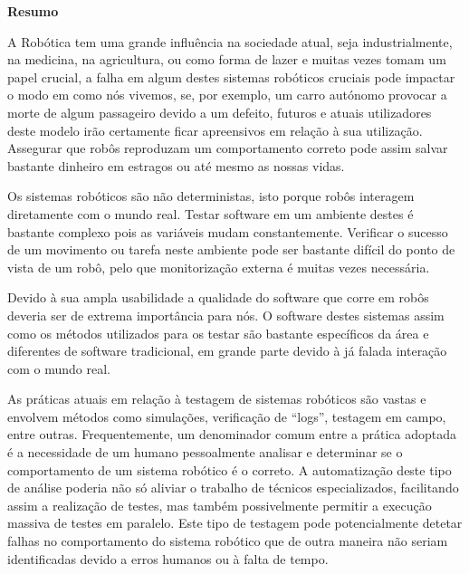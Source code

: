 
\vspace*{2cm}
\begin{center} \Large \bf Resumo
\end{center}
\vspace*{1cm} \setlength{\baselineskip}{0.6cm}

A Robótica tem uma grande influência na sociedade atual, seja industrialmente, na medicina, na agricultura, ou como forma de lazer e muitas vezes tomam um papel crucial, a falha em algum destes sistemas robóticos cruciais pode impactar o modo em como nós vivemos, se, por exemplo, um carro autónomo provocar a morte de algum passageiro devido a um defeito, futuros e atuais utilizadores deste modelo irão certamente ficar apreensivos em relação à sua utilização. Assegurar que robôs reproduzam um comportamento correto pode assim salvar bastante dinheiro em estragos ou até mesmo as nossas vidas.

Os sistemas robóticos são não deterministas, isto porque robôs interagem diretamente com o mundo real. Testar software em um ambiente destes é bastante complexo pois as variáveis mudam constantemente. Verificar o sucesso de um movimento ou tarefa neste ambiente pode ser bastante difícil do ponto de vista de um robô, pelo que monitorização externa é muitas vezes necessária. 

Devido à sua ampla usabilidade a qualidade do software que corre em robôs deveria ser de extrema importância para nós. O software destes sistemas assim como os métodos utilizados para os testar são bastante específicos da área e diferentes de software tradicional, em grande parte devido à já falada interação com o mundo real.

As práticas atuais em relação à testagem de sistemas robóticos são vastas e envolvem métodos como simulações, verificação de “logs”, testagem em campo, entre outras. Frequentemente, um denominador comum entre a prática adoptada é a necessidade de um humano pessoalmente analisar e determinar se o comportamento de um sistema robótico é o correto. A automatização deste tipo de análise poderia não só aliviar o trabalho de técnicos especializados, facilitando assim a realização de testes, mas também possivelmente permitir a execução massiva de testes em paralelo. Este tipo de testagem pode potencialmente detetar falhas no comportamento do sistema robótico que de outra maneira não seriam identificadas devido a erros humanos ou à falta de tempo.


